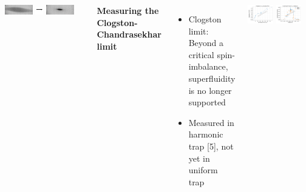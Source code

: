 \documentclass[26pt, paperwidth=36in,paperheight=48in]{tikzposter} %
\newcommand{\myfont}{\fontsize{26}{36}\selectfont}
\begin{document}
\begin{columns}
{		\begin{minipage}{0.5\textwidth}
			\hspace{3.0cm}
			\includegraphics[width=0.35\textwidth]{figures_retreat/no_RR_TOF.png}
			\includegraphics[width=0.1\textwidth]{figures_retreat/rightarrow.png}
			\includegraphics[width=0.35\textwidth]{figures_retreat/RR_TOF.png}
		\end{minipage}
		
		
		\vspace{2cm}
		\begin{minipage}{0.5\textwidth}
		\flushleft
		\textbf{Measuring the Clogston-Chandrasekhar limit}
		\vspace{0.5cm}
		\myfont
		\begin{minipage}{\textwidth}
			\flushleft
			\vspace{1.2cm}
			\begin{itemize}
				\item Clogston limit: Beyond a critical spin-imbalance, superfluidity is no longer supported
				\item Measured in harmonic trap [5], not yet in uniform trap
			\end{itemize}
		\end{minipage}
		
		\begin{minipage}{\textwidth}
		\hspace{2.0cm}
		\includegraphics[width=0.4\textwidth]{figures_retreat/Imbalance_Scan.pdf}
		\hspace{1.0cm}
		\includegraphics[width=0.4\textwidth]{figures_retreat/Condensate_Fraction_Evap_Calibration.pdf}
		\end{minipage}
	\end{minipage}
	}
	

\end{columns}
\end{document}
